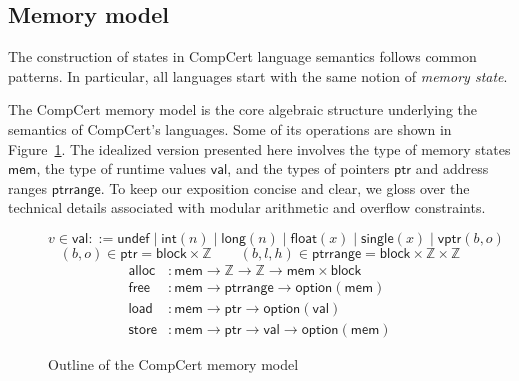 \documentclass[11pt,oneside,draft]{book}
\theoremstyle{definition}
\newcommand{\kw}[1]{\ensuremath{ \mathsf{#1} }}
\newcommand{\figsize}{}
\begin{document}
\subsection{Memory model} \label{sec:sem:mm} %

The construction of states in CompCert language semantics
follows common patterns.
In particular,
all languages start with
the same notion of \emph{memory state}.

The CompCert memory model \citep{compcertmm,compcertmmv2}
is the core algebraic structure
underlying the semantics of CompCert's languages.
Some of its operations
are shown in Figure~\ref{fig:mm}.
The idealized version presented here
involves
the type of memory states \kw{mem},
the type of runtime values \kw{val}, and
the types of pointers \kw{ptr} and address ranges \kw{ptrrange}.
To keep our exposition concise and clear,
we gloss over the technical details
associated with modular arithmetic and overflow constraints.

\begin{figure} %
  \figsize
  \[
    v \in \kw{val} ::=
          \kw{undef} \mid
          \kw{int}(n) \mid
          \kw{long}(n) \mid
          \kw{float}(x) \mid
          \kw{single}(x) \mid
          \kw{vptr}(b, o)
  \]
  \[
    (b, o) \in \kw{ptr} =
      \kw{block} \times \mathbb{Z}
    \qquad
    (b, l, h) \in \kw{ptrrange} =
      \kw{block} \times \mathbb{Z} \times \mathbb{Z}
  \]
  \begin{align*}
    \kw{alloc} &:
      \kw{mem} \rightarrow \mathbb{Z} \rightarrow \mathbb{Z} \rightarrow
      \kw{mem} \times \kw{block}
    \\
    \kw{free} &:
      \kw{mem} \rightarrow
      \kw{ptrrange} \rightarrow
      \kw{option}(\kw{mem})
    \\
    \kw{load} &:
      \kw{mem} \rightarrow \kw{ptr} \rightarrow \kw{option}(\kw{val})
    \\
    \kw{store} &:
      \kw{mem} \rightarrow \kw{ptr} \rightarrow \kw{val} \rightarrow \kw{option}(\kw{mem})
  \end{align*}
  \caption{Outline of the CompCert memory model}
  \label{fig:mm}
\end{figure}
\end{document}
